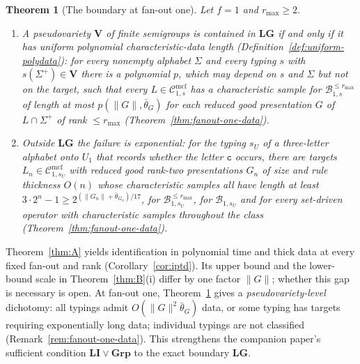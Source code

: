 \documentclass[11pt]{article}
\numberwithin{equation}{section}
\theoremstyle{plain}
\theoremstyle{definition}
\theoremstyle{remark}
\newcommand{\Cmcf}[2]{\mathcal{C}^{\mathrm{mcf}}_{#1,#2}}
\theoremstyle{plain}
\newtheorem{mainthm}{Theorem}
\begin{document}
\begin{mainthm}[The boundary at fan-out one]
\label{thm:C}
Let $f=1$ and $r_{\max}\ge2$.
\begin{enumerate}[label=\textup{(\roman*)},leftmargin=*]
\item A pseudovariety $\mathbf V$ of finite semigroups is contained in
$\mathbf{LG}$ if and only if it has \emph{uniform polynomial
characteristic-data length} \textup(Definition~\ref{def:uniform-polydata}\textup):
for every nonempty alphabet $\Sigma$ and every typing $s$ with $s(\Sigma^+)\in\mathbf V$
there is a polynomial $p$, which may depend on $s$ and $\Sigma$ but not on the
target, such that every $L\in\Cmcf{1}{s}$ has a characteristic sample for
$\mathcal B^{\le r_{\max}}_{1,s}$ of length at most $p(\|G\|,\bar\theta_G)$ for
each reduced good presentation $G$ of $L\cap\Sigma^+$ of rank $\le r_{\max}$
\textup(Theorem~\ref{thm:fanout-one-data}\textup).
\item Outside $\mathbf{LG}$ the failure is exponential: for the typing $s_U$
of a three-letter alphabet onto $U_1$ that records whether the letter
$\mathtt c$ occurs, there are targets $L_n\in\Cmcf{1}{s_U}$ with reduced good
rank-two presentations $G_n$ of size and rule thickness $O(n)$ whose
characteristic samples all have length at least
$3\cdot2^n-1\ge2^{(\|G_n\|+\bar\theta_{G_n})/17}$, for
$\mathcal B^{\le r_{\max}}_{1,s_U}$, for $\mathcal B_{1,s_U}$ and for every
set-driven operator with characteristic samples throughout the class
\textup(Theorem~\ref{thm:fanout-one-data}\textup).
\end{enumerate}
\end{mainthm}

Theorem~\ref{thm:A} yields identification in polynomial time and thick data
at every fixed fan-out and rank (Corollary~\ref{cor:iptd}).  Its upper bound
and the lower-bound scale in Theorem~\ref{thm:B}(i) differ by one factor
$\|G\|$; whether this gap is necessary is open.  At fan-out one,
Theorem~\ref{thm:C} gives a \emph{pseudovariety-level} dichotomy:
all typings admit $O(\|G\|^2\bar\theta_G)$ data, or some typing has targets
requiring exponentially long data; individual typings are not classified
(Remark~\ref{rem:fanout-one-data}).  This strengthens the companion paper's
sufficient condition $\mathbf{LI}\vee\mathbf{Grp}$ \cite{kuriyamaCFG}
to the exact boundary $\mathbf{LG}$.
\end{document}
